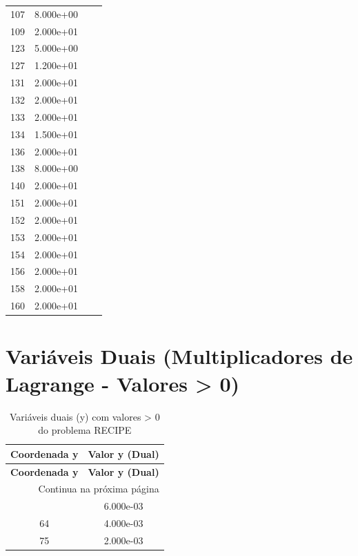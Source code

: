 \documentclass[12pt]{article}
\begin{document}
\begin{longtable}{@{}cccc@{}}
107 & 8.000e+00 &  &  \\
109 & 2.000e+01 &  &  \\
123 & 5.000e+00 &  &  \\
127 & 1.200e+01 &  &  \\
131 & 2.000e+01 &  &  \\
132 & 2.000e+01 &  &  \\
133 & 2.000e+01 &  &  \\
134 & 1.500e+01 &  &  \\
136 & 2.000e+01 &  &  \\
138 & 8.000e+00 &  &  \\
140 & 2.000e+01 &  &  \\
151 & 2.000e+01 &  &  \\
152 & 2.000e+01 &  &  \\
153 & 2.000e+01 &  &  \\
154 & 2.000e+01 &  &  \\
156 & 2.000e+01 &  &  \\
158 & 2.000e+01 &  &  \\
160 & 2.000e+01 &  &  \\

\bottomrule
\end{longtable}


\section{Variáveis Duais (Multiplicadores de Lagrange - Valores > 0)}

\begin{longtable}{@{}cc@{}}
\caption{Variáveis duais (y) com valores > 0 do problema RECIPE} \\
\toprule
\textbf{Coordenada y} & \textbf{Valor y (Dual)} \\
\midrule
\endfirsthead

\toprule
\textbf{Coordenada y} & \textbf{Valor y (Dual)} \\
\midrule
\endhead

\midrule \multicolumn{2}{r}{{Continua na próxima página}} \\ \midrule
\endfoot

\bottomrule
\endlastfoot
53 & 6.000e-03 \\
64 & 4.000e-03 \\
75 & 2.000e-03 \\

\bottomrule
\end{longtable}
\end{document}
